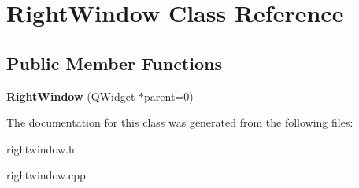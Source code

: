 \hypertarget{classRightWindow}{\section{Right\-Window Class Reference}
\label{classRightWindow}
}
\subsection*{Public Member Functions}
\begin{DoxyCompactItemize}
\item 
\hypertarget{classRightWindow_a1d17c817b2335e6cefec2be234848e47}{{\bfseries Right\-Window} (Q\-Widget $\ast$parent=0)}\label{classRightWindow_a1d17c817b2335e6cefec2be234848e47}

\end{DoxyCompactItemize}


The documentation for this class was generated from the following files\-:\begin{DoxyCompactItemize}
\item 
rightwindow.\-h\item 
rightwindow.\-cpp\end{DoxyCompactItemize}
